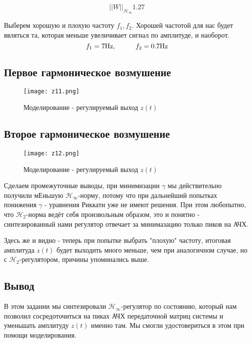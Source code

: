 $$
    ||W||_{\mathcal{H}_\infty} 1.27
$$

Выберем хорошую и плохую частоту $f_1, f_2$. 
Хорошей частотой для нас будет являться та, которая меньше увеличивает сигнал по амплитуде, и наоборот.
$$
    f_1 = 7 \text{Hz}, \hspace*{1cm} f_2 = 0.7 \text{Hz}
$$

\newpage
\subsection{Первое гармоническое возмушение}
\begin{figure}[ht]
    \centering
    \texttt{[image: z11.png]}
    \caption{Моделирование -  регулируемый выход $z(t)$}
  \end{figure}
\newpage
\subsection{Второе гармоническое возмушение}
\begin{figure}[ht]
    \centering
    \texttt{[image: z12.png]}
    \caption{Моделирование -  регулируемый выход $z(t)$}
  \end{figure}

Сделаем промежуточные выводы, при минимизации $\gamma$ мы действительно получили мЕньшую  $\mathcal{H}_\infty$-норму, потому что
при дальнейший попытках понижения $\gamma$ - уравнения Риккати уже не имеют решения. При этом любопытно, что $\mathcal{H}_2$-норма ведёт себя произвольным образом, 
это и понятно - синтезированный нами регулятор отвечает за минимазацию только пиков на АЧХ. 

Здесь же и видно - теперь при попытке выбрать "плохую" частоту, итоговая амплитуда $z(t)$ будет выходить много меньше, 
чем при аналогичном случае, но с $\mathcal{H}_2$-регулятором, причины упоминались выше.

\subsection{Вывод}

В этом задании мы синтезировали $\mathcal{H}_\infty$-регулятор по состоянию, который нам позволил 
сосредоточиться на пиках АЧХ передаточной матриц системы и уменьшать амплитуду $z(t)$ именно там. 
Мы смогли удостовериться в этом при помощи моделирования.

\endinput